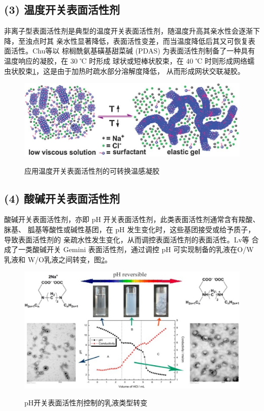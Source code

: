 \documentclass[bachelor,fandolfonts,replaceperiod]{jnuthesis}
\begin{document}
    \subsection*{(3) 温度开关表面活性剂}
    非离子型表面活性剂是典型的温度开关表面活性剂，随温度升高其亲水性会逐渐下降，至浊点时其
    亲水性显著降低，表面活性变差，而当温度降低后其又可恢复表面活性。Chu\cite{chu2011}等以
    棕榈酰氨基磺基甜菜碱 (PDAS) 为表面活性剂制备了一种具有温度响应的凝胶，在 30 ℃ 时形成
    球状或短棒状胶束，在 40 ℃ 时则形成网络蠕虫状胶束\ref{fig:switchable-temperature}，这是由于加热时疏水部分溶解度降低，
    从而形成网状交联凝胶。
    \begin{figure}[htbp]
        \centering
        \includegraphics[width=.711\textwidth]{figure/switchable-temperature.jpg}\\
        \caption{应用温度开关表面活性剂的可转换温感凝胶\cite{chu2011}}
        \label{fig:switchable-temperature}
    \end{figure}

    \subsection*{(4) 酸碱开关表面活性剂}
    酸碱开关表面活性剂，亦即 pH 开关表面活性剂，此类表面活性剂通常含有羧酸、脒基、
    胍基等酸性或碱性基团，在 pH 发生变化时，这些基团接受或给予质子，导致表面活性剂的
    亲疏水性发生变化，从而调控表面活性剂的表面活性\cite{吕湘亮2018}。Lv等\cite{lv2014}
    合成了一类酸碱开关 Gemini 表面活性剂，通过调控 pH 可实现制备的乳液在O/W乳液和
    W/O乳液之间转变，图\ref{fig:switchable-ph}。
    \begin{figure}[htbp]
        \centering
        \includegraphics[width=.87\textwidth]{figure/switchable-ph.jpg}\\
        \caption{pH开关表面活性剂控制的乳液类型转变\cite{lv2014}}
        \label{fig:switchable-ph}
    \end{figure}
\end{document}

